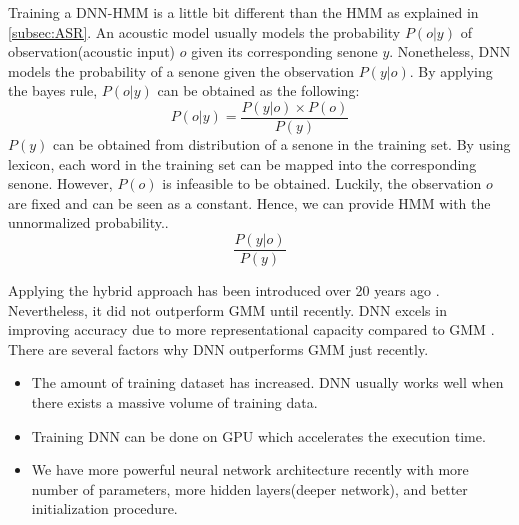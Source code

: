 Training a DNN-HMM is a little bit different than the HMM as explained in \ref{subsec:ASR}. An acoustic model usually models the probability $P(o|y)$ of observation(acoustic input) $o$ given its corresponding senone $y$. Nonetheless, DNN models the probability of a senone given the observation $P(y|o)$. By applying the bayes rule, $P(o|y)$ can be obtained as the following:
\begin{equation}
P(o|y)  = \frac{P(y|o) \times P(o)}{P(y)}
\end{equation}
$P(y)$ can be obtained from distribution of a senone in the training set. By using lexicon, each word in the training set can be mapped into the corresponding senone. However, $P(o)$ is infeasible to be obtained. Luckily, the observation $o$ are fixed and can be seen as a constant. Hence, we can provide HMM with the unnormalized probability..
\begin{equation}
\frac{P(y|o) }{P(y)}
\end{equation}

Applying the hybrid approach has been introduced over 20 years ago \cite{Bourlard:1993:CSR:562393,Renals1994}. Nevertheless, it did not outperform GMM until recently. DNN excels in improving accuracy due to more representational capacity compared to GMM \cite{1406.7806}. There are several factors why DNN outperforms GMM just recently.
\begin{itemize}
\item The amount of training dataset has increased. DNN usually works well when there exists a massive volume of training data.
\item Training DNN can be done on GPU which accelerates the execution time. 
\item We have more powerful neural network architecture recently with more number of parameters, more hidden layers(deeper network), and better initialization procedure. 
\end{itemize}




